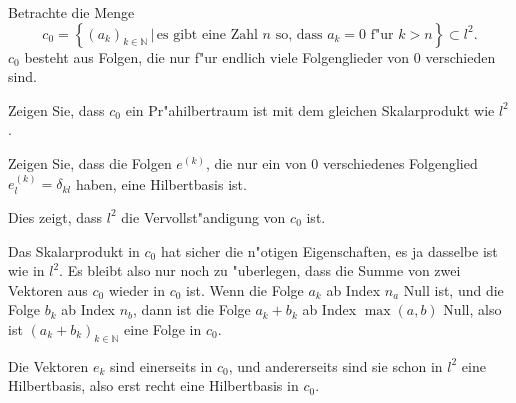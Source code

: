 Betrachte die Menge
\[
c_0=\left\{
(a_k)_{k\in\mathbb N}
\,|\,
\text{es gibt eine Zahl $n$ so, dass $a_k=0$ f"ur $k>n$}
\right\}
\subset l^2.
\]
$c_0$ besteht aus Folgen, die nur f"ur endlich viele Folgenglieder
von $0$ verschieden sind.
\begin{teilaufgaben}
\item Zeigen Sie, dass $c_0$ ein Pr"ahilbertraum ist mit dem gleichen
Skalarprodukt wie $l^2$.
\item Zeigen Sie, dass die Folgen $e^{(k)}$, die nur ein von $0$
verschiedenes Folgenglied 
$e^{(k)}_l=\delta_{kl}$
haben, eine Hilbertbasis ist.
\end{teilaufgaben}
Dies zeigt, dass $l^2$ die Vervollst"andigung von $c_0$ ist.

\begin{loesung}
\begin{teilaufgaben}
\item Das Skalarprodukt in $c_0$  hat sicher die n"otigen Eigenschaften,
es ja dasselbe ist wie in $l^2$. Es bleibt also nur noch zu "uberlegen,
dass die Summe von zwei Vektoren aus $c_0$ wieder in $c_0$ ist.
Wenn die Folge $a_k$ ab Index $n_a$ Null ist, und die Folge $b_k$ ab
Index $n_b$, dann ist die Folge $a_k+b_k$ ab Index $\operatorname{max}(a,b)$
Null, also ist $(a_k+b_k)_{k\in\mathbb N}$ eine Folge in $c_0$.
\item Die Vektoren $e_k$ sind einerseits in $c_0$, und andererseits
sind sie schon in $l^2$ eine Hilbertbasis, also erst recht eine Hilbertbasis
in $c_0$.
\end{teilaufgaben}
\end{loesung}

